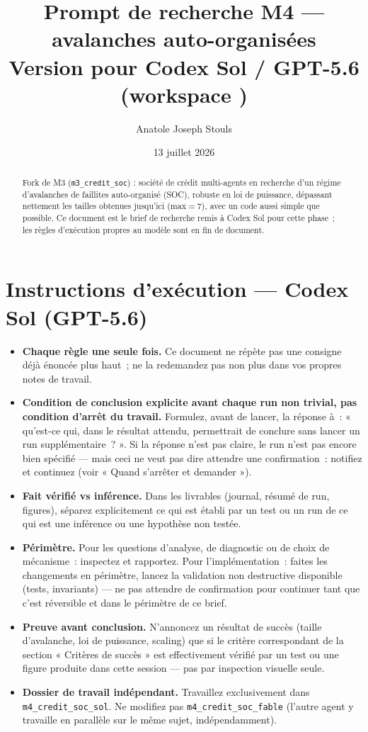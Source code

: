 \documentclass[11pt,a4paper]{article}
\title{Prompt de recherche M4 — avalanches auto-organisées\\
\large Version pour Codex Sol / GPT-5.6 (workspace \Workspace{})}
\author{Anatole Joseph Stouls}
\date{13 juillet 2026}
\newcommand{\code}[1]{\texttt{#1}}
\newcommand{\Workspace}{\code{m4\_credit\_soc\_sol}}
\newcommand{\OtherWorkspace}{\code{m4\_credit\_soc\_fable}}
\begin{document}
\maketitle

\begin{abstract}
Fork de M3 (\code{m3\_credit\_soc}) : société de crédit multi-agents en
recherche d'un régime d'avalanches de faillites auto-organisé (SOC), robuste
en loi de puissance, dépassant nettement les tailles obtenues jusqu'ici
(max$=7$), avec un code aussi simple que possible. Ce document est le brief
de recherche remis à Codex Sol pour cette phase~; les règles d'exécution
propres au modèle sont en fin de document.
\end{abstract}



\section*{Instructions d'exécution — Codex Sol (GPT-5.6)}

\begin{itemize}[leftmargin=*]
  \item \textbf{Chaque règle une seule fois.} Ce document ne répète pas une
    consigne déjà énoncée plus haut~; ne la redemandez pas non plus dans vos
    propres notes de travail.
  \item \textbf{Condition de conclusion explicite avant chaque run non
    trivial, pas condition d'arrêt du travail.} Formulez, avant de lancer,
    la réponse à~: « qu'est-ce qui, dans le résultat attendu, permettrait de
    conclure sans lancer un run supplémentaire~? ». Si la réponse n'est pas
    claire, le run n'est pas encore bien spécifié — mais ceci ne veut pas
    dire attendre une confirmation~: notifiez et continuez (voir « Quand
    s'arrêter et demander »).
  \item \textbf{Fait vérifié vs inférence.} Dans les livrables (journal,
    résumé de run, figures), séparez explicitement ce qui est établi par un
    test ou un run de ce qui est une inférence ou une hypothèse non
    testée.
  \item \textbf{Périmètre.} Pour les questions d'analyse, de diagnostic ou
    de choix de mécanisme~: inspectez et rapportez. Pour l'implémentation~:
    faites les changements en périmètre, lancez la validation non
    destructive disponible (tests, invariants) — ne pas attendre de
    confirmation pour continuer tant que c'est réversible et dans le
    périmètre de ce brief.
  \item \textbf{Preuve avant conclusion.} N'annoncez un résultat de succès
    (taille d'avalanche, loi de puissance, scaling) que si le critère
    correspondant de la section « Critères de succès » est effectivement
    vérifié par un test ou une figure produite dans cette session — pas par
    inspection visuelle seule.
  \item \textbf{Dossier de travail indépendant.} Travaillez exclusivement
    dans \Workspace{}. Ne modifiez pas \OtherWorkspace{} (l'autre agent y
    travaille en parallèle sur le même sujet, indépendamment).
\end{itemize}
\end{document}
